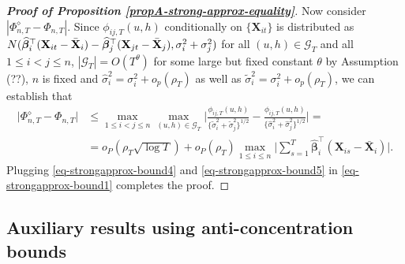 \begin{proof}[\textnormal{\textbf{Proof of Proposition \ref{propA-strong-approx-equality}}}]
Now consider $|\Phi_{n, T}^{\diamond} - \Phi_{n, T}|$. Since $\phi_{ij, T}(u,h)$ conditionally on $\{\mathbf{X}_{it}\}$ is distributed as $ N(\widehat{\bm{\beta}}_i^\top (\mathbf{X}_{it} - \bar{\mathbf{X}}_{i}) -  \widehat{\bm{\beta}}_j^\top (\mathbf{X}_{jt} - \bar{\mathbf{X}}_{j}),\sigma^2_i + \sigma^2_j)$ for all $(u,h) \in \mathcal{G}_T$ and all $1\le i < j \le n$, $|\mathcal{G}_T| = O(T^\theta)$ for some large but fixed constant $\theta$ by Assumption (??), $n$ is fixed and $\widehat{\sigma}^2_i = \sigma^2_i + o_p(\rho_T)$ as well as $\widetilde{\sigma}^2_i = \sigma^2_i + o_p(\rho_T)$, we can establish that
\begin{align}\label{eq-strongapprox-bound5}
\big| \Phi_{n, T}^{\diamond} - \Phi_{n, T} \big| &\le \max_{1\leq i< j \leq n}\max_{(u,h) \in \mathcal{G}_T} \Big|\frac{\phi_{ij, T}(u,h)}{\{\widetilde{\sigma}_i^2 + \widetilde{\sigma}_j^2 \}^{1/2}} - \frac{\phi_{ij, T}(u,h)}{\{\widehat{\sigma}_i^2 + \widehat{\sigma}_j^2 \}^{1/2}}\Big| = \nonumber\\
&=o_P(\rho_T \sqrt{\log T}) + o_P(\rho_T)\max_{1\le i\le n} \Big|\sum\limits_{s=1}^T \widehat{\bm{\beta}}_i^\top(\mathbf{X}_{is} - \bar{\mathbf{X}}_{i} )\Big|.
\end{align}
Plugging \eqref{eq-strongapprox-bound4} and \eqref{eq-strongapprox-bound5} in \eqref{eq-strongapprox-bound1} completes the proof.
\end{proof}



\subsection*{Auxiliary results using anti-concentration bounds}


